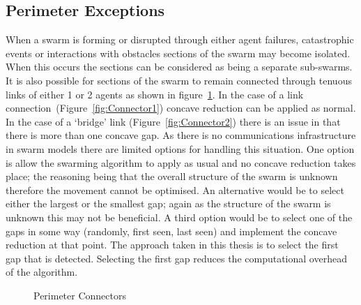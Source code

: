 \subsection{Perimeter Exceptions}\label{concave:Exceptions}
When a swarm is forming or disrupted through either agent failures, catastrophic events or interactions with obstacles sections of the swarm may become isolated. When this occurs the sections can be considered as being a separate sub-swarms. It is also possible for sections of the swarm to remain connected through tenuous links of either 1 or 2 agents as shown in figure~\ref{fig:PerimeterConnectors}. In the case of a link connection~(Figure~\ref{fig:Connector1}) concave reduction can be applied as normal. In the case of a `bridge' link (Figure~\ref{fig:Connector2}) there is an issue in that there is more than one concave gap. As there is no communications infrastructure in swarm models there are limited options for handling this situation. One option is allow the swarming algorithm to apply as usual and no concave reduction takes place; the reasoning being that the overall structure of the swarm is unknown therefore the movement cannot be optimised. An alternative would be to select either the largest or the smallest gap; again as the structure of the swarm is unknown this may not be beneficial. A third option would be to select one of the gaps in some way (randomly, first seen, last seen) and implement the concave reduction at that point. The approach taken in this thesis is to select the first gap that is detected. Selecting the first gap reduces the computational overhead of the algorithm.

\begin{figure}[H]
\centering
{}
\caption[Perimeter Connectors]{Perimeter Connectors}
\label{fig:PerimeterConnectors}
\end{figure}

